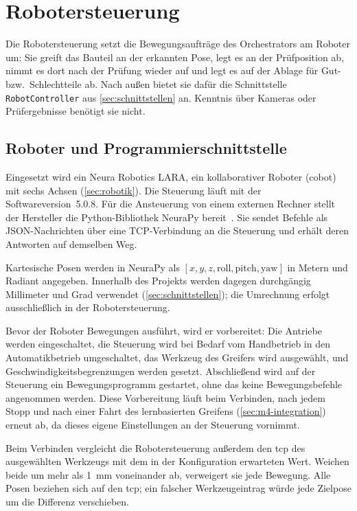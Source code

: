 \chapter{Robotersteuerung}
\label{ch:robotersteuerung}

Die Robotersteuerung setzt die Bewegungsaufträge des Orchestrators am Roboter um: Sie greift
das Bauteil an der erkannten Pose, legt es an der Prüfposition ab, nimmt es dort nach der
Prüfung wieder auf und legt es auf der Ablage für Gut- bzw.\ Schlechtteile ab. Nach außen
bietet sie dafür die Schnittstelle \texttt{RobotController} aus \cref{sec:schnittstellen}
an. Kenntnis über Kameras oder Prüfergebnisse benötigt sie nicht.

\section{Roboter und Programmierschnittstelle}
\label{sec:m2-api}

Eingesetzt wird ein Neura Robotics LARA, ein kollaborativer Roboter (\ac{cobot}) mit sechs
Achsen (\cref{sec:robotik}). Die Steuerung läuft mit der Softwareversion~5.0.8. Für die
Ansteuerung von einem externen Rechner stellt der Hersteller die Python-Bibliothek NeuraPy
bereit~\cite{neura2025neurapy}. Sie sendet Befehle als JSON-Nachrichten über eine
TCP-Verbindung an die Steuerung und erhält deren Antworten auf demselben Weg.

Kartesische Posen werden in NeuraPy als $[x, y, z, \text{roll}, \text{pitch}, \text{yaw}]$
in Metern und Radiant angegeben. Innerhalb des Projekts werden dagegen durchgängig
Millimeter und Grad verwendet (\cref{sec:schnittstellen}); die Umrechnung erfolgt
ausschließlich in der Robotersteuerung.

Bevor der Roboter Bewegungen ausführt, wird er vorbereitet: Die Antriebe werden
eingeschaltet, die Steuerung wird bei Bedarf vom Handbetrieb in den Automatikbetrieb
umgeschaltet, das Werkzeug des Greifers wird ausgewählt, und Geschwindigkeitsbegrenzungen
werden gesetzt. Abschließend wird auf der Steuerung ein Bewegungsprogramm gestartet, ohne das
keine Bewegungsbefehle angenommen werden. Diese Vorbereitung läuft beim Verbinden, nach
jedem Stopp und nach einer Fahrt des lernbasierten Greifens (\cref{sec:m4-integration})
erneut ab, da dieses eigene Einstellungen an der Steuerung vornimmt.

Beim Verbinden vergleicht die Robotersteuerung außerdem den \ac{tcp} des ausgewählten Werkzeugs
mit dem in der Konfiguration erwarteten Wert. Weichen beide um mehr als \SI{1}{\milli\metre}
voneinander ab, verweigert sie jede Bewegung. Alle Posen beziehen sich auf den \ac{tcp}; ein
falscher Werkzeugeintrag würde jede Zielpose um die Differenz verschieben.

